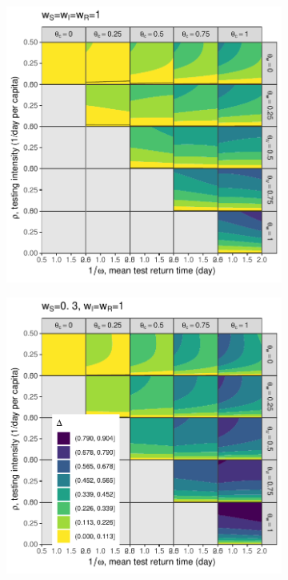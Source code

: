 \documentclass[12pt]{article}
\DeclareRobustCommand\_{\ifmmode\expandafter\subtxt\else\textunderscore\fi}
\theoremstyle{definition} %
\begin{document}
\begin{figure}[h!]
\centering
\begin{subfigure}[t]{.45\textwidth}
\centering
\includegraphics[width=\linewidth]{codes/R0contour_random_rho.5.pdf}
\caption{}\label{p.a}
\end{subfigure}
%
\begin{subfigure}[t]{.45\textwidth}
\centering
\includegraphics[width=\linewidth]{codes/R0contour_TTI_rho.5.pdf}

\end{subfigure}
\end{figure}
\end{document}
